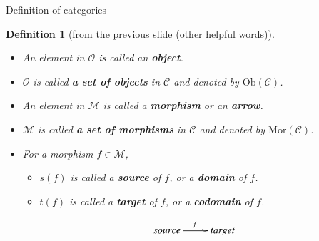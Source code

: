 \documentclass[dvipdfmx,10pt,notheorems]{beamer}
\newtheorem{definition}[theorem]{Definition}
\renewcommand{\#}{^\sharp}
\begin{document}
	\begin{frame}{Definition of categories}
			\begin{definition}[from the previous slide (other helpful words)]
					\begin{itemize}
							\item An element in $\mathcal{O}$ is called an {\bf object}.
							\item $\mathcal{O}$ is called {\bf a set of objects}
							in $\mathcal{C}$ and denoted by $\mathrm{Ob}(\mathcal{C})$.
							\item An element in $\mathcal{M}$ is called a {\bf morphism} or an {\bf arrow}.
							\item $\mathcal{M}$ is called {\bf a set of morphisms} in $\mathcal{C}$
							 and denoted by $\mathrm{Mor}(\mathcal{C})$.
							\item For a morphism $f\in\mathcal{M}$,
							 		\begin{itemize}
											\item $s(f)$ is called a {\bf source} of $f$, or a {\bf domain} of $f$.
											\item $t(f)$ is called a {\bf target} of $f$, or a {\bf codomain} of $f$.
									\end{itemize}
							\begin{equation*}
									\begin{gathered}
															\xymatrix{
															source
															\ar[r]^{f}
															&
															target
															}
									\end{gathered}
							\end{equation*}
					\end{itemize}
			\end{definition}
	\end{frame}
	
	
	
\end{document}

